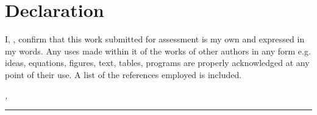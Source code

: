 %
\chapter*{Declaration}
\label{sec:declaration}
\thispagestyle{empty}

I, \thesisName, confirm that this work submitted for assessment is my own and expressed in my words. Any uses made within it of the works of other authors in any form e.g. ideas, equations, figures, text, tables, programs are properly acknowledged at any point of their use. A list of the references employed is included.

\bigskip

\noindent\textit{\thesisUniversityCity, \thesisDate}

\smallskip

\begin{flushright}
	\begin{minipage}{5cm}
		\rule{\textwidth}{1pt}
		\centering\thesisName
	\end{minipage}
\end{flushright}


